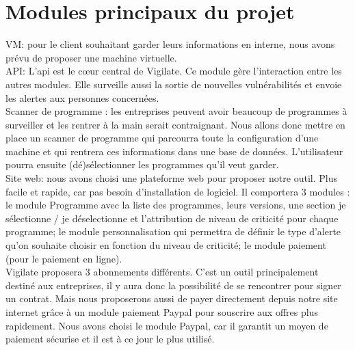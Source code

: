 \section{Modules principaux du projet}
VM: pour le client souhaitant garder leurs informations en interne, nous avons prévu de proposer une machine virtuelle.\\
API: L'api est le c\oe{}ur central de Vigilate. Ce module gère l'interaction entre les autres modules. Elle surveille aussi la sortie de nouvelles vulnérabilités et envoie les alertes aux personnes concernées.\\
Scanner de programme : les entreprises peuvent avoir beaucoup de programmes à surveiller et les rentrer à la main serait contraignant. Nous allons donc mettre en place un scanner de programme qui parcourra toute la configuration d'une machine et qui rentrera ces informations dans une base de données. L'utilisateur pourra ensuite (dé)sélectionner les programmes qu'il veut garder.\\
Site web: nous avons choisi une plateforme web pour proposer notre outil. Plus facile et rapide, car pas besoin d'installation de logiciel. Il comportera 3 modules : le module \og{}Programme\fg{} avec la liste des programmes, leurs versions, une section \og{}je sélectionne / je déselectionne\fg{} et l'attribution de niveau de criticité pour chaque programme; le module \og{}personnalisation\fg{} qui permettra de définir le type d'alerte qu'on souhaite choisir en fonction du niveau de criticité; le module paiement (pour le paiement en ligne).\\
Vigilate proposera 3 abonnements différents. C'est un outil principalement destiné aux entreprises, il y aura donc la possibilité de se rencontrer pour signer un contrat. Mais nous proposerons aussi de payer directement depuis notre site internet grâce à un module paiement Paypal pour souscrire aux offres plus rapidement. Nous avons choisi le module Paypal, car il garantit un moyen de paiement sécurise et il est à ce jour le plus utilisé.\\
